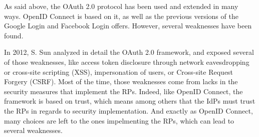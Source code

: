 As said above, the OAuth 2.0 protocol has been used and extended in many ways. OpenID Connect is based on it, as well as the previous versions of the Google Login and Facebook Login offers. However, several weaknesses have been found.

In 2012, S. Sun analyzed in detail the OAuth 2.0 framework, and exposed several of those weaknesses\cite{Sun2012}, like access token disclosure through network eavesdropping or cross-site scripting (XSS), impersonation of users, or Cross-site Request Forgery (CSRF). Most of the time, those weaknesses come from lacks in the security measures that implement the RPs. Indeed, like OpenID Connect, the framework is based on trust, which means among others that the IdPs must trust the RPs in regards to security implementation. And exactly as OpenID Connect, many choices are left to the ones impelmenting the RPs, which can lead to several weaknesses.
